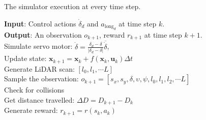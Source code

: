 \begin{algorithm}[htb!]
\caption{The simulator execution at every time step.}\label{alg:simulator_step}
\nonl \textbf{Input}: Control actions $\dot{\delta}_d$ and $a_{\text{long}_d}$ at time step $k$. \\
\nonl \textbf{Output}: An observation $o_{k+1}$, reward $r_{k+1}$ at time step $k+1$.\\
\vspace{0.2cm} 
Simulate servo motor: $\dot{\delta} = \frac{\delta_d - \delta}{|\delta_d - \delta|} \overline{\dot{\delta}}$,\\
Update state: $\mathbf{x}_{k+1} = \mathbf{x}_{k} + f(\mathbf{x}_k, \mathbf{u}_k) \Delta t$ \\
Generate LiDAR scan: $[l_0, l_1, \cdots L]$ \\
Sample the observation: $o_{k+1} = [s_{x}, s_{y}, {\delta}, {\upsilon}, \psi, l_0, l_1, l_2, \cdots L]$\\
Check for collisions \\
Get distance travelled: $\Delta D = D_{k+1} - D_{k}$  \\
Generate reward: $r_{k+1} = r(s_k,a_k)$\\
\end{algorithm}

